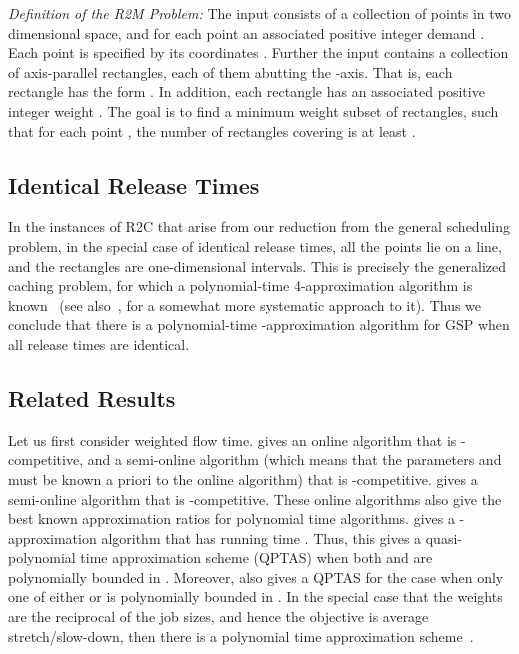 \documentclass[11pt]{article}
\begin{document}
\medskip

{\em Definition of the R2M Problem:}
The input consists of a collection of  points in two dimensional space,
and for each point  an associated positive integer demand .
Each point  is specified by its coordinates .
Further the input contains a collection  of axis-parallel rectangles, 
each of them abutting the -axis. 
That is, each rectangle  has the form  . 
In addition, each rectangle  has an associated 
positive integer weight .
The goal is to find a minimum weight subset  of rectangles, 
such that for each point , the number of 
rectangles covering  is at least .




\subsection{ Identical Release Times}
In the instances of R2C that arise from our reduction from the 
general scheduling problem, in the special case of identical release times,
all the points lie on a line, and the rectangles are one-dimensional intervals.
This is precisely the generalized caching problem, for which a  polynomial-time
4-approximation algorithm is known~\cite{BBF} (see also~\cite{CGK10}, for a somewhat more systematic approach to it). 
Thus we conclude that there is a polynomial-time -approximation 
algorithm for GSP
when all release times are identical.


\subsection{ Related Results}
\label{s:related}
Let us first consider weighted flow time.
\cite{BansalD07}
gives an online algorithm that is 
-competitive, and a semi-online algorithm 
(which means that the parameters  and  must be known
a priori to the online algorithm) that 
is -competitive. \cite{ChekuriKZ01} gives a semi-online algorithm that is -competitive.
These online algorithms also give the best known approximation ratios 
for polynomial time algorithms.
\cite{ChekuriK02}
gives a -approximation algorithm that 
 has running time . 
Thus, this gives a quasi-polynomial time approximation
scheme (QPTAS) when both  and  are polynomially bounded in . 
Moreover, \cite{ChekuriK02} also gives a QPTAS for the case when only one of either  or
 is polynomially bounded in . 
In the special case that the weights are the reciprocal of the job sizes, and hence the objective is
average stretch/slow-down, then there is a polynomial time approximation
scheme~\cite{BenderMR04,ChekuriK02}.
\end{document}
